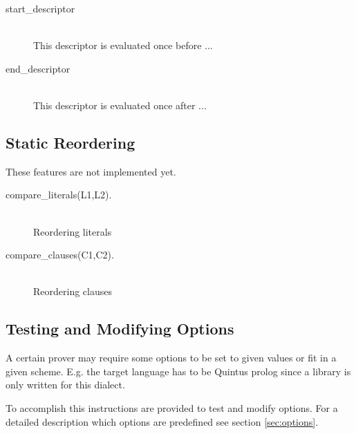 \begin{description}
  \item [start\_descriptor]\ \\
	This descriptor is evaluated once before ...

  \item [end\_descriptor]\ \\
	This descriptor is evaluated once after ...
\end{description}

\subsection{Static Reordering}

These features are not implemented yet. 

\begin{description}
  \item [compare\_literals(L1,L2).]\ \\
	Reordering literals

  \item [compare\_clauses(C1,C2).]\ \\
	Reordering clauses
\end{description}

\fi


\subsection{Testing and Modifying Options}

A certain prover may require some options to be set to given values or fit in
a given scheme. E.g. the target language has to be Quintus prolog since a
library is only written for this dialect.

To accomplish this instructions are provided to test and modify options. For a
detailed description which options are predefined see section
\ref{sec:options}.

